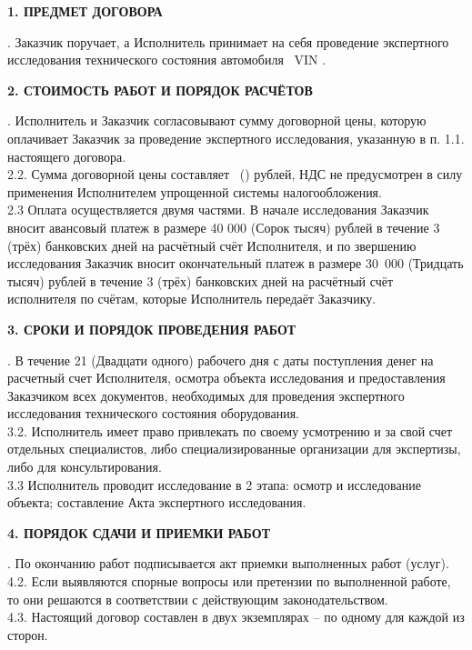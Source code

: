 \documentclass[a4paper,12pt,english,notitlepage]{report}
\begin{document}
         
\begin{center}
	\textbf{1. ПРЕДМЕТ ДОГОВОРА}
\end{center}
\vspace{-3mm}
 . Заказчик поручает, а Исполнитель принимает на себя проведение экспертного исследования технического состояния  автомобиля  \, VIN \vin.


\begin{center}
	\textbf{2. СТОИМОСТЬ РАБОТ И ПОРЯДОК РАСЧЁТОВ}
\end{center}
\vspace{-3mm}
 . Исполнитель и Заказчик согласовывают сумму договорной цены, которую оплачивает Заказчик   за проведение экспертного исследования, указанную в п. 1.1. настоящего договора.\\ 
2.2. Сумма договорной цены составляет ~(\!\!\!\!\!\!) рублей, НДС не предусмотрен в силу применения Исполнителем упрощенной системы налогообложения.\\
2.3 Оплата осуществляется двумя частями. В начале исследования Заказчик вносит авансовый платеж в размере 40 000 (Сорок тысяч)  рублей в течение 3 (трёх) банковских дней на расчётный счёт Исполнителя, и по звершению исследования Заказчик вносит окончательный платеж в размере 30~000 (Тридцать тысяч) рублей в течение 3 (трёх) банковских дней на расчётный счёт исполнителя по счётам, которые Исполнитель передаёт Заказчику.


\begin{center}
	\textbf{3. СРОКИ И ПОРЯДОК ПРОВЕДЕНИЯ РАБОТ}
\end{center}
\vspace{-3mm}
 . В течение 21 (Двадцати одного) рабочего дня с даты поступления денег на расчетный счет
Исполнителя, осмотра объекта исследования и предоставления Заказчиком всех документов,
необходимых для проведения экспертного исследования технического состояния оборудования.\\
3.2. Исполнитель имеет право привлекать по своему усмотрению и за свой счет отдельных 
специалистов, либо специализированные организации для экспертизы, либо для консультирования.\\
3.3 Исполнитель проводит исследование в 2 этапа: осмотр и исследование объекта; составление Акта экспертного исследования.

\begin{center}
	\textbf{4. ПОРЯДОК СДАЧИ И ПРИЕМКИ РАБОТ}
\end{center}
\vspace{-3mm}
 . По окончанию работ подписывается акт приемки выполненных работ (услуг).\\
4.2. Если выявляются спорные вопросы или претензии по выполненной работе, то они решаются в соответствии с действующим законодательством.\\
4.3. Настоящий договор составлен в двух экземплярах – по одному для каждой из сторон.
\end{document}
